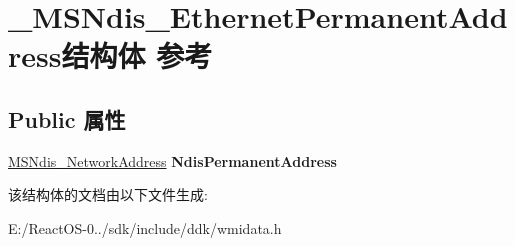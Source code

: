 \hypertarget{struct___m_s_ndis___ethernet_permanent_address}{}\section{\+\_\+\+M\+S\+Ndis\+\_\+\+Ethernet\+Permanent\+Address结构体 参考}
\label{struct___m_s_ndis___ethernet_permanent_address}
\subsection*{Public 属性}
\begin{DoxyCompactItemize}
\item 
\mbox{\label{struct___m_s_ndis___ethernet_permanent_address_a216be79efbae967d6d00a70773122f0e}} 
\hyperlink{struct___m_s_ndis___network_address}{M\+S\+Ndis\+\_\+\+Network\+Address} {\bfseries Ndis\+Permanent\+Address}
\end{DoxyCompactItemize}


该结构体的文档由以下文件生成\+:\begin{DoxyCompactItemize}
\item 
E\+:/\+React\+O\+S-\/0../sdk/include/ddk/wmidata.\+h\end{DoxyCompactItemize}
